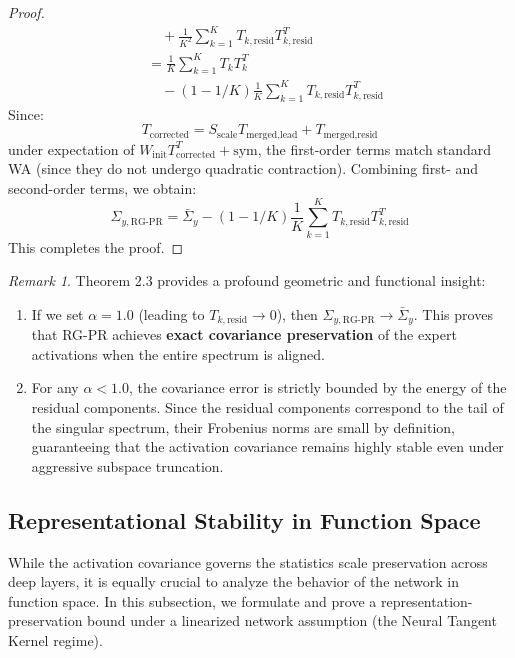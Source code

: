 \documentclass{article}
\theoremstyle{plain}
\theoremstyle{definition}
\theoremstyle{remark}
\newtheorem{remark}[theorem]{Remark}
\begin{document}
\begin{proof}
\begin{align*}
    &\quad + \frac{1}{K^2} \sum_{k=1}^K T_{k, \text{resid}} T_{k, \text{resid}}^T \\
    &= \frac{1}{K} \sum_{k=1}^K T_k T_k^T \\
    &\quad - (1 - 1/K) \frac{1}{K} \sum_{k=1}^K T_{k, \text{resid}} T_{k, \text{resid}}^T
\end{align*}
Since:
\begin{equation}
    T_{\text{corrected}} = S_{\text{scale}} T_{\text{merged}, \text{lead}} + T_{\text{merged}, \text{resid}}
\end{equation}
under expectation of $W_{\text{init}} T_{\text{corrected}}^T + \text{sym}$, the first-order terms match standard WA (since they do not undergo quadratic contraction). Combining first- and second-order terms, we obtain:
\begin{equation}
    \Sigma_{y, \text{RG-PR}} = \bar{\Sigma}_y - (1 - 1/K) \frac{1}{K} \sum_{k=1}^K T_{k, \text{resid}} T_{k, \text{resid}}^T
\end{equation}
This completes the proof.
\end{proof}

\begin{remark}
Theorem 2.3 provides a profound geometric and functional insight:
\begin{enumerate}
    \item If we set $\alpha = 1.0$ (leading to $T_{k, \text{resid}} \to 0$), then $\Sigma_{y, \text{RG-PR}} \to \bar{\Sigma}_y$. This proves that RG-PR achieves \textbf{exact covariance preservation} of the expert activations when the entire spectrum is aligned.
    \item For any $\alpha < 1.0$, the covariance error is strictly bounded by the energy of the residual components. Since the residual components correspond to the tail of the singular spectrum, their Frobenius norms are small by definition, guaranteeing that the activation covariance remains highly stable even under aggressive subspace truncation.
\end{enumerate}
\end{remark}

\subsection{Representational Stability in Function Space}
While the activation covariance governs the statistics scale preservation across deep layers, it is equally crucial to analyze the behavior of the network in function space. In this subsection, we formulate and prove a representation-preservation bound under a linearized network assumption (the Neural Tangent Kernel regime).
\end{document}

